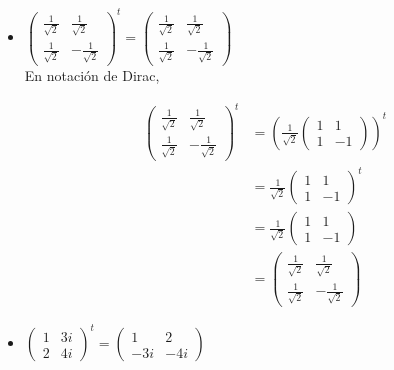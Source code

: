 \documentclass[osajnl,preprint,showpacs,superscriptaddress,10pt]{revtex4-1} %
\begin{document}
\begin{itemize}
    \item $\begin{pmatrix}\frac{1}{\sqrt{2}} & \frac{1}{\sqrt{2}} \\ \frac{1}{\sqrt{2}} & -\frac{1}{\sqrt{2}}\end{pmatrix}^t = \begin{pmatrix}\frac{1}{\sqrt{2}} & \frac{1}{\sqrt{2}} \\ \frac{1}{\sqrt{2}} & -\frac{1}{\sqrt{2}}\end{pmatrix}$ \\
    
    En notación de Dirac,
    \begin{fleqn}[\parindent]
    \begin{equation}
    \begin{split}
        \begin{pmatrix}\frac{1}{\sqrt{2}} & \frac{1}{\sqrt{2}} \\ \frac{1}{\sqrt{2}} & -\frac{1}{\sqrt{2}}\end{pmatrix}^t
            &= \left (\frac{1}{\sqrt{2}}\begin{pmatrix}1 & 1 \\ 1 & -1\end{pmatrix} \right)^t \\
            &= \frac{1}{\sqrt{2}} \begin{pmatrix}1 & 1 \\ 1 & -1\end{pmatrix}^t \\
            &= \frac{1}{\sqrt{2}} \begin{pmatrix}1 & 1 \\ 1 & -1\end{pmatrix} \\
            &= \begin{pmatrix}\frac{1}{\sqrt{2}} & \frac{1}{\sqrt{2}} \\ \frac{1}{\sqrt{2}} & -\frac{1}{\sqrt{2}}\end{pmatrix}
    \end{split}
    \end{equation}
    \end{fleqn}
    
    \item $\begin{pmatrix}1 & 3i \\ 2 & 4i\end{pmatrix}^t = \begin{pmatrix}1 & 2 \\ -3i & -4i\end{pmatrix}$ \\
    

\end{itemize}
\end{document}

